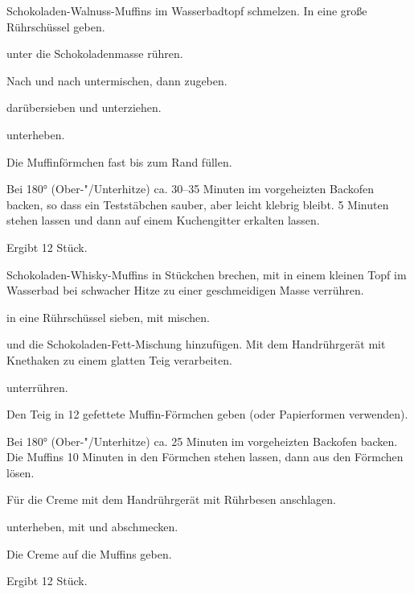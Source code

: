\begin{recipe}{Schokoladen-Walnuss-Muffins}
  im Wasserbadtopf schmelzen. In eine große Rührschüssel geben.

  unter die Schokoladenmasse rühren.

  Nach und nach
  untermischen, dann 
  zugeben.
  
  darübersieben und unterziehen.
  
  unterheben.

  Die Muffinförmchen fast bis zum Rand füllen.

  Bei 180° (Ober-"/Unterhitze) ca. 30--35 Minuten im vorgeheizten
  Backofen backen, so dass ein Teststäbchen sauber, aber leicht klebrig
  bleibt. 5 Minuten stehen lassen und dann auf einem Kuchengitter
  erkalten lassen.

  Ergibt 12 Stück.
\end{recipe}

\begin{recipe}{Schokoladen-Whisky-Muffins}
  in Stückchen brechen, mit
  in einem kleinen Topf im Wasserbad bei schwacher Hitze zu einer
  geschmeidigen Masse verrühren.

  in eine Rührschüssel sieben, mit
  mischen.
  
  und die Schokoladen-Fett-Mischung
  hinzufügen. Mit dem Handrührgerät mit Knethaken zu einem glatten Teig
  verarbeiten.
  
  unterrühren.
  
  Den Teig in 12 gefettete Muffin-Förmchen geben (oder Papierformen
  verwenden).

  Bei 180° (Ober-"/Unterhitze) ca. 25 Minuten im vorgeheizten Backofen
  backen. Die Muffins 10 Minuten in den Förmchen stehen lassen, dann aus
  den Förmchen lösen.

  Für die Creme
  mit dem Handrührgerät mit Rührbesen anschlagen.

  unterheben, mit
  und
  abschmecken.

  Die Creme auf die Muffins geben.

  Ergibt 12 Stück.
\end{recipe}

